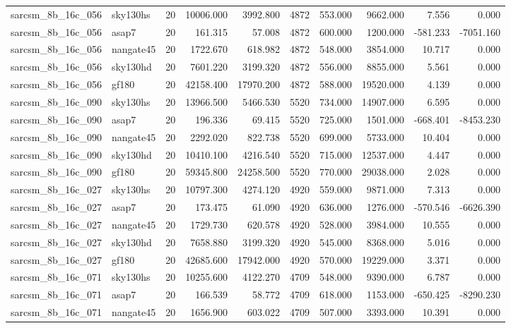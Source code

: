 \begin{tabular}{llrrrrrrrr}
sarcsm\_8b\_16c\_056 & sky130hs & 20 & 10006.000 & 3992.800 & 4872 & 553.000 & 9662.000 & 7.556 & 0.000 \\
sarcsm\_8b\_16c\_056 & asap7 & 20 & 161.315 & 57.008 & 4872 & 600.000 & 1200.000 & -581.233 & -7051.160 \\
sarcsm\_8b\_16c\_056 & nangate45 & 20 & 1722.670 & 618.982 & 4872 & 548.000 & 3854.000 & 10.717 & 0.000 \\
sarcsm\_8b\_16c\_056 & sky130hd & 20 & 7601.220 & 3199.320 & 4872 & 556.000 & 8855.000 & 5.561 & 0.000 \\
sarcsm\_8b\_16c\_056 & gf180 & 20 & 42158.400 & 17970.200 & 4872 & 588.000 & 19520.000 & 4.139 & 0.000 \\
sarcsm\_8b\_16c\_090 & sky130hs & 20 & 13966.500 & 5466.530 & 5520 & 734.000 & 14907.000 & 6.595 & 0.000 \\
sarcsm\_8b\_16c\_090 & asap7 & 20 & 196.336 & 69.415 & 5520 & 725.000 & 1501.000 & -668.401 & -8453.230 \\
sarcsm\_8b\_16c\_090 & nangate45 & 20 & 2292.020 & 822.738 & 5520 & 699.000 & 5733.000 & 10.404 & 0.000 \\
sarcsm\_8b\_16c\_090 & sky130hd & 20 & 10410.100 & 4216.540 & 5520 & 715.000 & 12537.000 & 4.447 & 0.000 \\
sarcsm\_8b\_16c\_090 & gf180 & 20 & 59345.800 & 24258.500 & 5520 & 770.000 & 29038.000 & 2.028 & 0.000 \\
sarcsm\_8b\_16c\_027 & sky130hs & 20 & 10797.300 & 4274.120 & 4920 & 559.000 & 9871.000 & 7.313 & 0.000 \\
sarcsm\_8b\_16c\_027 & asap7 & 20 & 173.475 & 61.090 & 4920 & 636.000 & 1276.000 & -570.546 & -6626.390 \\
sarcsm\_8b\_16c\_027 & nangate45 & 20 & 1729.730 & 620.578 & 4920 & 528.000 & 3984.000 & 10.555 & 0.000 \\
sarcsm\_8b\_16c\_027 & sky130hd & 20 & 7658.880 & 3199.320 & 4920 & 545.000 & 8368.000 & 5.016 & 0.000 \\
sarcsm\_8b\_16c\_027 & gf180 & 20 & 42685.600 & 17942.000 & 4920 & 570.000 & 19229.000 & 3.371 & 0.000 \\
sarcsm\_8b\_16c\_071 & sky130hs & 20 & 10255.600 & 4122.270 & 4709 & 548.000 & 9390.000 & 6.787 & 0.000 \\
sarcsm\_8b\_16c\_071 & asap7 & 20 & 166.539 & 58.772 & 4709 & 618.000 & 1153.000 & -650.425 & -8290.230 \\
sarcsm\_8b\_16c\_071 & nangate45 & 20 & 1656.900 & 603.022 & 4709 & 507.000 & 3393.000 & 10.391 & 0.000 \\

\end{tabular}
